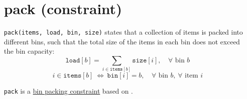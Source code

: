 \label{pack}
\hypertarget{pack}{}

\section{pack (constraint)}\label{pack:packconstraint}\hypertarget{pack:packconstraint}{}

\begin{notedef}
  \texttt{pack(items, load, bin, size)} states that a collection of items is packed into different bins, such that the total size of the items in each bin does not exceed the bin capacity:
$$ \mathtt{load}[b] = \sum_{i\in\mathtt{items}[b]} \mathtt{size}[i],\quad\forall \text{ bin } b $$
$$ i\in\mathtt{items}[b]\ \iff\ \mathtt{bin}[i]=b,\quad\forall \text{ bin } b,\ \forall \text{ item } i $$
\end{notedef}
\texttt{pack} is a \href{http://www.emn.fr/x-info/sdemasse/gccat/Cbin_packing.html}{bin packing constraint} based on \cite{ShawCP04}. 

